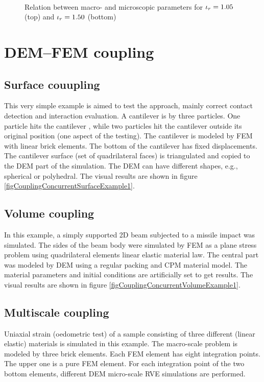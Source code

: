 \begin{figure}
	\centering
	\\
	\caption[Relation between macro- and microscopic parameters]{Relation between macro- and microscopic parameters for $\iota_r=1{.}05$ (top) and $\iota_r=1{.}50$ (bottom)}
\end{figure}


\section{DEM--FEM coupling}

\subsection{Surface couupling}
This very simple example is aimed to test the approach, mainly correct contact detection and interaction evaluation.
A cantilever is  by three particles.
One particle hits the cantilever , while two particles hit the cantilever outside its original position (one aspect of the testing).
The cantilever is modeled by FEM with linear brick elements. The bottom of the cantilever has fixed displacements.
The cantilever surface (set of quadrilateral faces) is triangulated and copied to the DEM part of the simulation.
The DEM  can have different shapes, e.g., spherical or polyhedral.
The visual results are shown in figure \ref{figCouplingConcurrentSurfaceExample1}.

\subsection{Volume coupling}
In this example, a simply supported 2D beam subjected to a missile impact was simulated.
The sides of the beam body were simulated by FEM as a plane stress problem using quadrilateral elements linear elastic material law.
The central part was modeled by DEM using a regular packing and CPM material model.
The material parameters and initial conditions are artificially set to get  results.
The visual results are shown in figure \ref{figCouplingConcurrentVolumeExample1}.

\subsection{Multiscale coupling}
Uniaxial strain (oedometric test) of a sample consisting of three different (linear elastic) materials is simulated in this example.
The macro-scale problem is modeled by three brick elements.
Each FEM element has eight integration points.
The upper one is a pure FEM element.
For each integration point of the two bottom elements, different DEM micro-scale RVE simulations are performed.

